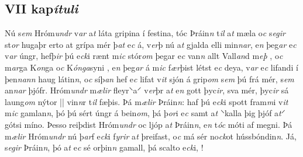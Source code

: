 \beginnumbering 
\pstart  
\vspace{5mm}\subsection*{VII kap\textit{ítuli}} 
Nú s\textit{em} Hróm\textit{undr} v\textit{ar} a\textit{t} láta gripina í festina, tóc  Þráin\textit{n} t\textit{il} a\textit{t} mæla o\textit{c} s\textit{egir} st\textit{or} hugaþr erto   at  grípa   mér þ\textit{at} e\textit{c} á, v\textit{er}þ   nú a\textit{t}  gjalda   elli min\textit{n}\textit{ar}, e\textit{n} þeg\textit{ar} e\textit{c} v\textit{ar} úngr, hefþ\textit{ir} þú e\textit{ck}i rænt m\textit{ic}  stór\textit{om} þegar e\textit{c} van\textit{n} allt Vall\textit{an}d m\textit{eþ} , o\textit{c} m\textit{ar}ga  K\textit{on}ga o\textit{c}
K\textit{ónga}syni  , e\textit{n} þeg\textit{ar} á m\textit{ic} f\textit{ær}þist   létst e\textit{c} deya, v\textit{ar} e\textit{c} lifandi í þen\textit{n}\textit{an}\textit{n} haug látin\textit{n},  o\textit{c} síþ\textit{an} hef e\textit{c}  lifat v\textit{it}  sjón á grip\textit{om}  s\textit{em} þú  frá mér, s\textit{em} an\textit{n}\textit{ar} þjófr. Hróm\textit{undr} m\textit{ælir} fleyr⸌a⸍ v\textit{er}þr a\textit{t}  e\textit{n} gott  þyc\textit{ir},  
 sva   mér, þyc\textit{ir} sá laung\textit{om}   nýtor 
||
  vin\textit{n}r t\textit{il} fæþis. Þá m\textit{ælir} Þráin\textit{n}: haf
þú e\textit{ck}i spott   fram\textit{m}i v\textit{it} m\textit{ic} gamlan\textit{n}, þó   þú sért úngr á bein\textit{om}, þá  þ\textit{or}i e\textit{c}
samt a\textit{t} ⸌kalla þig þjóf a\textit{t}⸍ gótsi míno. 
Þesso reiþdist Hróm\textit{undr} oc ljóp a\textit{t} Þráin\textit{n}, e\textit{n}  t\textit{óc}  móti af megni. Þá m\textit{ælir} Hróm\textit{undr} nú þ\textit{ar}f e\textit{ck}i f\textit{yrir} a\textit{t} þreifast, o\textit{c} má sér   no\textit{ck}ot hússbóndin\textit{n}. Já, s\textit{egir} Þráin\textit{n}, þó a\textit{t} e\textit{c} sé orþin\textit{n} gamall, þá scalto  e\textit{ck}i,   ! 
